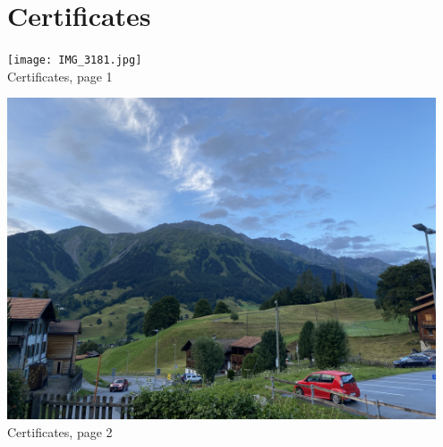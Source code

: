 \documentclass[11pt,a4paper,sans]{moderncv} %
\begin{document}
\section{Certificates}
\begin{minipage}{\textwidth}
  \centering
  \texttt{[image: IMG\_3181.jpg]} \\
  Certificates, page 1
\end{minipage}
\newpage
\begin{minipage}{\textwidth}
  \centering
  \includegraphics[width=0.95\textwidth]{IMG_3200.jpg} \\
  Certificates, page 2

\end{minipage}

\clearpage
\end{document}
